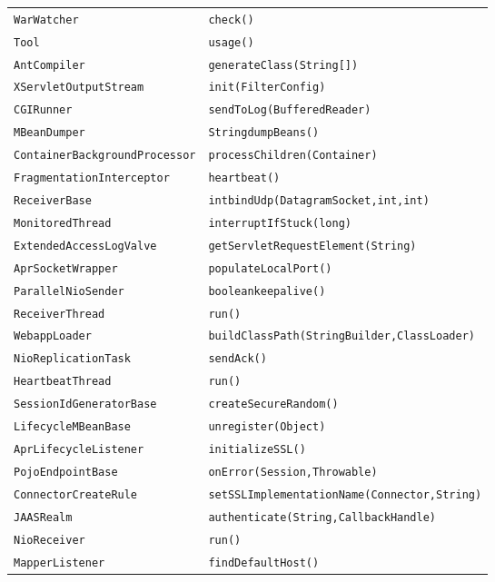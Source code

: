 \begin{center}
\begin{longtable}{ll}
 \lstinline/WarWatcher/&{\lstinline/check()/}\\
 \lstinline/Tool/&{\lstinline/usage()/}\\
 \lstinline/AntCompiler/&{\lstinline/generateClass(String[])/}\\
 \lstinline/XServletOutputStream/&{\lstinline/init(FilterConfig)/}\\
 \lstinline/CGIRunner/&{\lstinline/sendToLog(BufferedReader)/}\\
 \lstinline/MBeanDumper/&{\lstinline/StringdumpBeans()/}\\
 \lstinline/ContainerBackgroundProcessor/&{\lstinline/processChildren(Container)/}\\
 \lstinline/FragmentationInterceptor/&{\lstinline/heartbeat()/}\\
 \lstinline/ReceiverBase/&{\lstinline/intbindUdp(DatagramSocket,int,int)/}\\
 \lstinline/MonitoredThread/&{\lstinline/interruptIfStuck(long)/}\\
 \lstinline/ExtendedAccessLogValve/&{\lstinline/getServletRequestElement(String)/}\\
 \lstinline/AprSocketWrapper/&{\lstinline/populateLocalPort()/}\\
 \lstinline/ParallelNioSender/&{\lstinline/booleankeepalive()/}\\
 \lstinline/ReceiverThread/&{\lstinline/run()/}\\
 \lstinline/WebappLoader/&{\lstinline/buildClassPath(StringBuilder,ClassLoader)/}\\
 \lstinline/NioReplicationTask/&{\lstinline/sendAck()/}\\
 \lstinline/HeartbeatThread/&{\lstinline/run()/}\\
 \lstinline/SessionIdGeneratorBase/&{\lstinline/createSecureRandom()/}\\
 \lstinline/LifecycleMBeanBase/&{\lstinline/unregister(Object)/}\\
 \lstinline/AprLifecycleListener/&{\lstinline/initializeSSL()/}\\
 \lstinline/PojoEndpointBase/&{\lstinline/onError(Session,Throwable)/}\\
 \lstinline/ConnectorCreateRule/&{\lstinline/setSSLImplementationName(Connector,String)/}\\
 \lstinline/JAASRealm/&{\lstinline/authenticate(String,CallbackHandle)/}\\
 \lstinline/NioReceiver/&{\lstinline/run()/}\\
 \lstinline/MapperListener/&{\lstinline/findDefaultHost()/}\\

\end{longtable}
\end{center}
